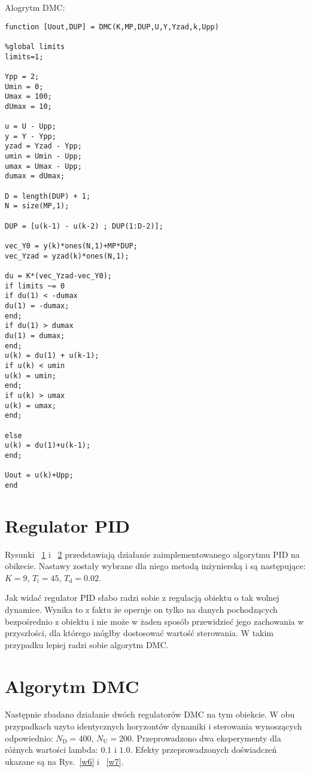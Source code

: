 Alogrytm DMC:
\begin{lstlisting}[style=customc,frame=single] 
function [Uout,DUP] = DMC(K,MP,DUP,U,Y,Yzad,k,Upp)

%global limits
limits=1;

Ypp = 2;
Umin = 0;
Umax = 100;
dUmax = 10;

u = U - Upp;
y = Y - Ypp;
yzad = Yzad - Ypp;
umin = Umin - Upp;
umax = Umax - Upp;
dumax = dUmax;

D = length(DUP) + 1;
N = size(MP,1);

DUP = [u(k-1) - u(k-2) ; DUP(1:D-2)];

vec_Y0 = y(k)*ones(N,1)+MP*DUP;
vec_Yzad = yzad(k)*ones(N,1);

du = K*(vec_Yzad-vec_Y0);
if limits ~= 0
if du(1) < -dumax
du(1) = -dumax;
end;
if du(1) > dumax
du(1) = dumax;
end;
u(k) = du(1) + u(k-1);
if u(k) < umin
u(k) = umin;
end;
if u(k) > umax
u(k) = umax;
end;

else
u(k) = du(1)+u(k-1);
end;

Uout = u(k)+Upp;
end
\end{lstlisting}

\section{Regulator PID}
Rysunki ~\ref{w4} i ~\ref{w5} przedstawiają działanie zaimplementowanego algorytmu PID na obikecie. Nastawy zostały wybrane dla niego metodą inżynierską i są następujące: $K=9$, $T_\mathrm{i}=45$, $T_\mathrm{d}=0.02$.

\begin{figure}

	\centering
	\caption{ }
	
		\label{w4}
\end{figure}

\begin{figure}

	\centering
	\caption{ }
	
		\label{w5}
\end{figure}

\FloatBarrier
Jak widać regulator PID słabo radzi sobie z regulacją obiektu o tak wolnej dynamice. Wynika to z faktu że operuje on tylko na danych pochodzących bezpośrednio z obiektu i nie może w żaden sposób przewidzieć jego zachowania w przyszłości, dla którego mógłby dostosować wartość sterowania. W takim przypadku lepiej radzi sobie algorytm DMC.

\section{Algorytm DMC}
Następnie zbadano działanie dwóch regulatorów DMC na tym obiekcie. W obu przypadkach uzyto identycznych horyzontów dynamiki i sterowania wynoszących odpowiednio: $N_\mathrm{D}=400$, $N_\mathrm{U}=200$. Przeprowadzono dwa eksperymenty dla różnych wartości lambda: $0.1$ i $1.0$. Efekty przeprowadzonych doświadczeń ukazane są na Rys.~\ref{w6} i ~\ref{w7}.

